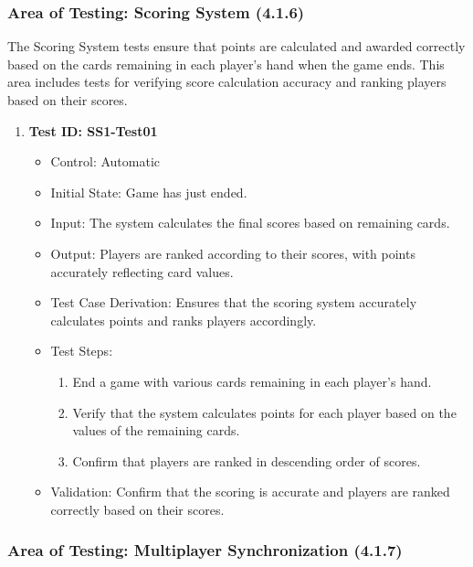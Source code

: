 \documentclass[12pt, titlepage]{article}
\begin{document}
\subsubsection{Area of Testing: Scoring System (4.1.6)}

The Scoring System tests ensure that points are calculated and awarded correctly based on the cards remaining in each player’s hand when the game ends. This area includes tests for verifying score calculation accuracy and ranking players based on their scores.

\begin{enumerate}
    \item \textbf{Test ID: SS1-Test01}
        \begin{itemize}
            \item Control: Automatic
            \item Initial State: Game has just ended.
            \item Input: The system calculates the final scores based on remaining cards.
            \item Output: Players are ranked according to their scores, with points accurately reflecting card values.
            \item Test Case Derivation: Ensures that the scoring system accurately calculates points and ranks players accordingly.
            \item Test Steps:
                \begin{enumerate}
                    \item End a game with various cards remaining in each player’s hand.
                    \item Verify that the system calculates points for each player based on the values of the remaining cards.
                    \item Confirm that players are ranked in descending order of scores.
                \end{enumerate}
            \item Validation: Confirm that the scoring is accurate and players are ranked correctly based on their scores.
        \end{itemize}
\end{enumerate}

\subsubsection{Area of Testing: Multiplayer Synchronization (4.1.7)}
\end{document}
